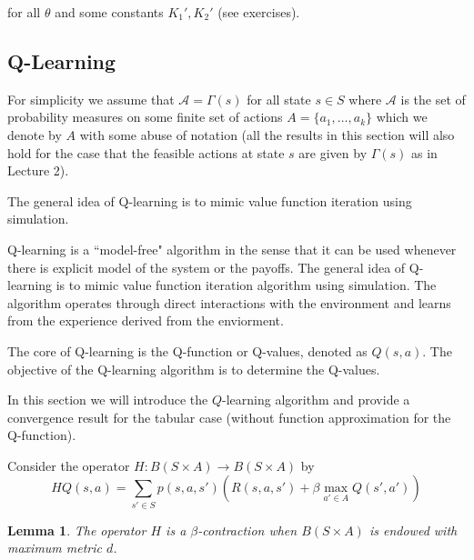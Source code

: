 \documentclass[letter,11pt]{article}
\newtheorem{lemma}{Lemma}[section]
\begin{document}
for all \(\theta\) and some constants \( K_{1}',K_{2}' \) (see exercises).







\subsection{Q-Learning} \label{Section:Q-learning}


 For simplicity we assume that $\mathcal{A} = \Gamma(s)$ for all state $s \in S$ where $\mathcal{A}$ is the set of probability measures on some finite set of actions $A = \{a_{1},\ldots,a_{k} \}$ which we denote by $A$ with some abuse of notation (all the results in this section will also hold for the case that the feasible actions at state $s$ are given by $\Gamma(s)$ as in Lecture 2). 

The general idea of Q-learning is to mimic value function iteration using simulation. 

Q-learning is a ``model-free" algorithm in the sense that it can be used whenever there is explicit model of the system or the payoffs. The general idea of Q-learning is to mimic value function iteration algorithm using simulation. The algorithm operates through direct interactions with the environment and learns from the experience derived from the enviorment. 


The core of Q-learning is the Q-function or Q-values, denoted as \( Q(s, a) \). The objective of the Q-learning algorithm is to determine the Q-values. 

In this section we will introduce the $Q$-learning algorithm and provide a convergence result for the tabular case (without function approximation for the Q-function). 



 Consider the operator $H:B(S \times A) \rightarrow B(S \times A)$ by
$$HQ(s,a) = \sum _{s' \in S} p(s,a,s') \left ( R(s,a,s') + \beta \max_{a' \in A} Q(s' , a') \right )$$

\begin{lemma} \label{Lem:H is contraction}
The operator $H$ is a $\beta$-contraction when $B(S \times A)$ is endowed with maximum metric $d$. 
\end{lemma}
\end{document}
